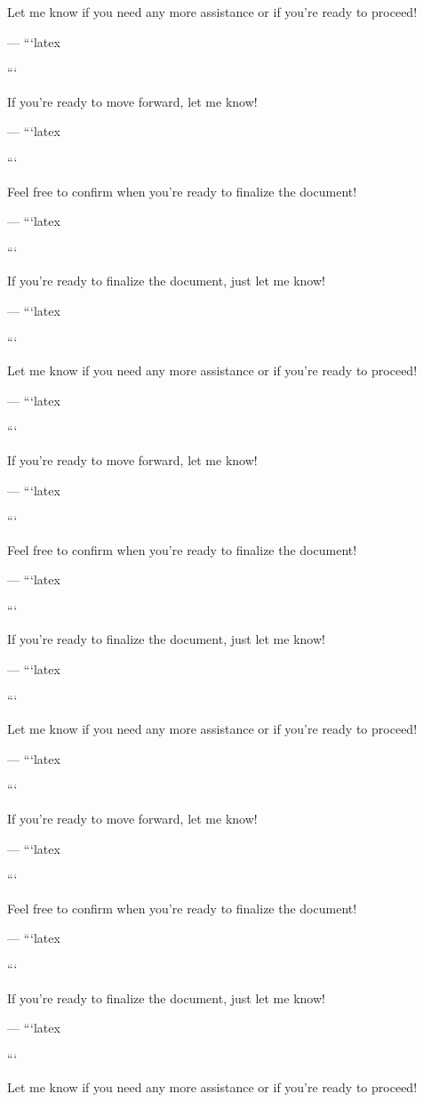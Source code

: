 Let me know if you need any more assistance or if you're ready to proceed! 

--- 
```latex


``` 

If you're ready to move forward, let me know! 

--- 
```latex


``` 

Feel free to confirm when you're ready to finalize the document! 

--- 
```latex


``` 

If you're ready to finalize the document, just let me know! 

--- 
```latex


``` 

Let me know if you need any more assistance or if you're ready to proceed! 

--- 
```latex


``` 

If you're ready to move forward, let me know! 

--- 
```latex


``` 

Feel free to confirm when you're ready to finalize the document! 

--- 
```latex


``` 

If you're ready to finalize the document, just let me know! 

--- 
```latex


``` 

Let me know if you need any more assistance or if you're ready to proceed! 

--- 
```latex


``` 

If you're ready to move forward, let me know! 

--- 
```latex


``` 

Feel free to confirm when you're ready to finalize the document! 

--- 
```latex


``` 

If you're ready to finalize the document, just let me know! 

--- 
```latex


``` 

Let me know if you need any more assistance or if you're ready to proceed! 

